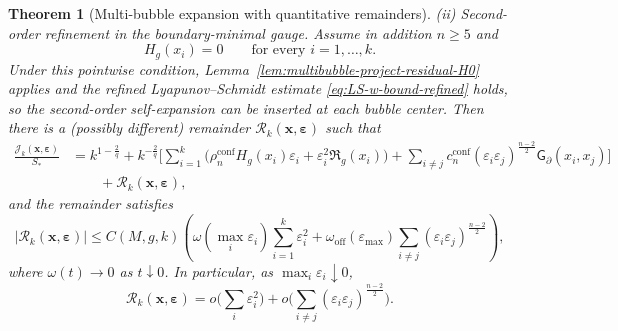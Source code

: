 \documentclass[11pt,reqno,a4paper]{amsart}
\numberwithin{equation}{section}
\theoremstyle{plain}
\newtheorem{theorem}{Theorem}[section]
\theoremstyle{remark}
\theoremstyle{plain}
\begin{document}
\begin{theorem}[Multi-bubble expansion with quantitative remainders]
\medskip\noindent
\textup{(ii) Second-order refinement in the boundary-minimal gauge.}
Assume in addition $n\ge5$ and
\begin{equation}\label{eq:Jk-refined-hyp}
H_g(x_i)=0\qquad\text{for every }i=1,\dots,k.
\end{equation}
Under this pointwise condition, Lemma~\ref{lem:multibubble-project-residual-H0} applies and the refined
Lyapunov--Schmidt estimate \eqref{eq:LS-w-bound-refined} holds, so the second-order
self-expansion can be inserted at each bubble center. Then there is a (possibly different) remainder
$\mathcal R_k(\mathbf x,\boldsymbol\varepsilon)$ such that
\begin{equation}\label{eq:Jk-expansion}
\begin{aligned}
\frac{\mathcal J_k(\mathbf x,\boldsymbol\varepsilon)}{S_\ast}
&= k^{1-\frac{2}{q}}
+ k^{-\frac{2}{q}}\Bigg[
\sum_{i=1}^k \big(\rho_n^{\mathrm{conf}}H_g(x_i)\varepsilon_i+\varepsilon_i^2\mathfrak R_g(x_i)\big)
+ \sum_{i\neq j} c_n^{\mathrm{conf}}(\varepsilon_i\varepsilon_j)^{\frac{n-2}{2}}
\mathsf G_\partial(x_i,x_j)\Bigg]\\
&\qquad+ \mathcal R_k(\mathbf x,\boldsymbol\varepsilon),
\end{aligned}
\end{equation}
and the remainder satisfies
\begin{equation}\label{eq:Jk-remainder}
|\mathcal R_k(\mathbf x,\boldsymbol\varepsilon)|
\le
C(M,g,k)\left(
\omega\left(\max_i\varepsilon_i\right)\sum_{i=1}^k \varepsilon_i^{2}
+
\omega_{\mathrm{off}}(\varepsilon_{\max})
\sum_{i\ne j}(\varepsilon_i\varepsilon_j)^{\frac{n-2}{2}}
\right),
\end{equation}
where $\omega(t)\to0$ as $t\downarrow0$.
In particular, as $\max_i\varepsilon_i\downarrow0$,
\[
\mathcal R_k(\mathbf x,\boldsymbol\varepsilon)
=o\Big(\sum_i \varepsilon_i^2\Big)
+o\Big(\sum_{i\ne j}(\varepsilon_i\varepsilon_j)^{\frac{n-2}{2}}\Big).
\]
\end{theorem}
\end{document}
